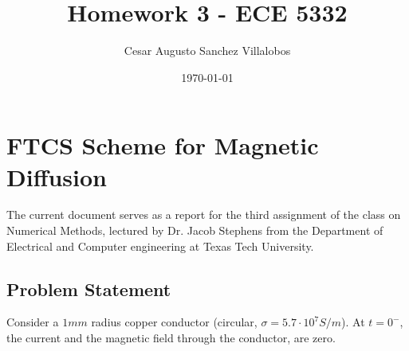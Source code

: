 \documentclass{article}
\begin{document}
\title{Homework 3 - ECE 5332}
\author{Cesar Augusto Sanchez Villalobos}
\date{\today}
\maketitle

\section{FTCS Scheme for Magnetic Diffusion}

The current document serves as a report for the third assignment of the class on Numerical Methods, lectured by Dr. Jacob Stephens from the Department of Electrical and Computer engineering at Texas Tech University.

\subsection{Problem Statement}

Consider a $1 mm$ radius copper conductor (circular, $\sigma = 5.7\cdot 10^7 S/m$). At $t = 0^-$, the current and the magnetic field through the conductor, are zero. 
\end{document}
